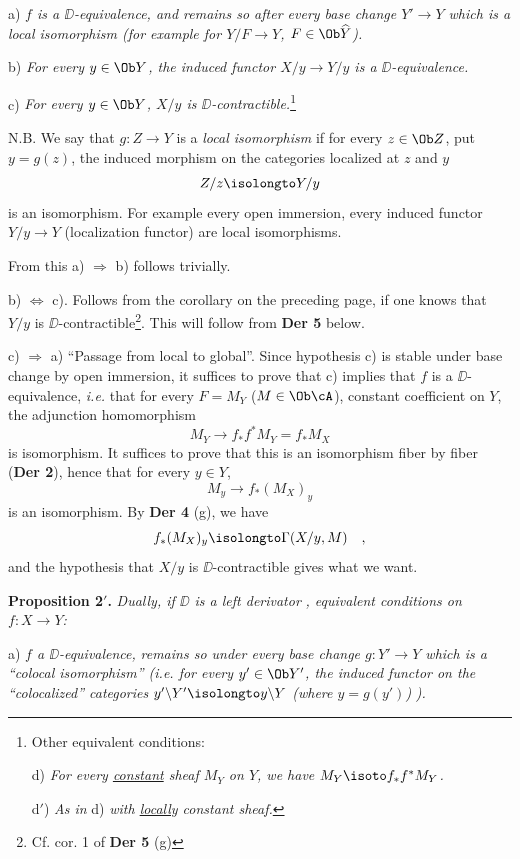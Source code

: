a) \textit{$f$ is a $\DD$-equivalence, and remains so after every base change $Y' \to Y$ which is a local isomorphism (for example for $Y/F \to Y$, $F \in \Ob \widehat{Y}$).}

b) \textit{For every $y \in \Ob Y$, the induced functor $X/y \to Y/y$ is a $\DD$-equivalence.}

c) \textit{For every $y \in \Ob Y$, $X/y$ is $\DD$-contractible.}\footnote[25]{Other equivalent conditions:\par
\indent d) \textit{For every \underline{constant} sheaf $M_Y$ on $Y$, we have $M_Y \isoto f_*f^*M_Y$.}\par
\indent d$'$) \textit{As in} d) \textit{with \underline{locally} constant sheaf.}}

\noindent N.B. We say that $g : Z \to Y$ is a \textit{local isomorphism} if for every $z \in \Ob Z$, put $y = g(z)$, the induced morphism on the categories localized at $z$ and $y$
\[
Z/z \isolongto Y/y
\]
is an isomorphism. For example every open immersion, every induced functor $Y/y \to Y$ (localization functor) are local isomorphisms.

From this a) $\Rightarrow$ b) follows trivially.

b) $\Leftrightarrow$ c). Follows from the corollary on the preceding page, if one knows that $Y/y$ is $\DD$-contractible\footnote[26]{Cf. cor. 1 of \textbf{Der 5} (g)}. This will follow from \textbf{Der 5} below.

\noindent{}

c) $\Rightarrow$ a) ``Passage from local to global''. Since hypothesis c) is stable under base change by open immersion, it suffices to prove that c) implies that $f$ is a $\DD$-equivalence, \textit{i.e.} that for every $F = M_Y$ ($M \in \Ob \cA$), constant coefficient on $Y$, the adjunction homomorphism
\[
M_Y \longrightarrow f_*f^*M_Y = f_*M_X
\]
is isomorphism. It suffices to prove that this is an isomorphism fiber by fiber (\textbf{Der 2}), hence that for every $y \in Y$,
\[
M_y \longrightarrow f_*(M_X)_y
\]
is an isomorphism. By \textbf{Der 4} (g), we have
\[
f_*(M_X)_y \isolongto \Gamma(X/y, M) \quad ,
\]
and the hypothesis that $X/y$ is $\DD$-contractible gives what we want.

\noindent\textbf{Proposition 2$'$.} \textit{Dually, if $\DD$ is a left derivator} \textit{, equivalent conditions on $f : X \to Y$:}

a) \textit{$f$ a $\DD$-equivalence,} \textit{remains so under every base change $g : Y' \to Y$ which is a ``colocal isomorphism'' (i.e. for every $y' \in \Ob Y'$, the induced functor on the ``colocalized'' categories $y'\backslash Y' \isolongto y\backslash Y$ (where $y = g(y')$)} \textit{).}

